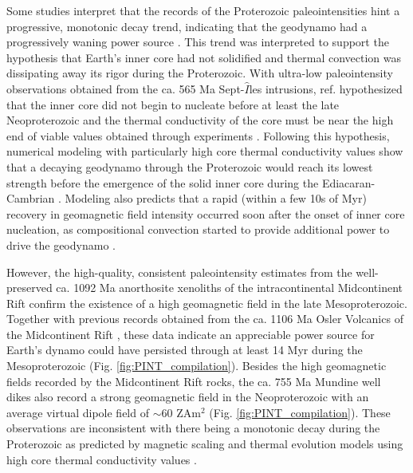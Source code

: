 \documentclass[9pt,twocolumn,twoside,lineno]{pnas-new}
\begin{document}
Some studies interpret that the records of the Proterozoic paleointensities hint a progressive, monotonic decay trend, indicating that the geodynamo had a progressively waning power source \cite[e.g.]{Bono2019a}. This trend was interpreted to support the hypothesis that Earth's inner core had not solidified and thermal convection was dissipating away its rigor during the Proterozoic. With ultra-low paleointensity observations obtained from the ca. 565 Ma Sept-$\hat{I}$les intrusions, ref. \citealp{Bono2019a} hypothesized that the inner core did not begin to nucleate before at least the late Neoproterozoic and the thermal conductivity of the core must be near the high end of viable values obtained through experiments \cite{Ohta2016a}. Following this hypothesis, numerical modeling with particularly high core thermal conductivity values show that a decaying geodynamo through the Proterozoic would reach its lowest strength before the emergence of the solid inner core during the Ediacaran-Cambrian \cite{Davies2021a}. Modeling also predicts that a rapid (within a few 10s of Myr) recovery in geomagnetic field intensity occurred soon after the onset of inner core nucleation, as compositional convection started to provide additional power to drive the geodynamo \cite{Driscoll2016a}. 

However, the high-quality, consistent paleointensity estimates from the well-preserved ca. 1092 Ma anorthosite xenoliths of the intracontinental Midcontinent Rift confirm the existence of a high geomagnetic field in the late Mesoproterozoic. Together with previous records obtained from the ca. 1106 Ma Osler Volcanics of the Midcontinent Rift \cite{Sprain2018a}, these data indicate an appreciable power source for Earth's dynamo could have persisted through at least 14 Myr during the Mesoproterozoic (Fig. \ref{fig:PINT_compilation}). Besides the high geomagnetic fields recorded by the Midcontinent Rift rocks, the ca. 755 Ma Mundine well dikes also record a strong geomagnetic field in the Neoproterozoic with an average virtual dipole field of $\sim$60 ZAm$^2$ (Fig. \ref{fig:PINT_compilation}). These observations are inconsistent with there being a monotonic decay during the Proterozoic as predicted by magnetic scaling and thermal evolution models using high core thermal conductivity values \cite{Aubert2009a, Davies2021a}. 
\end{document}
